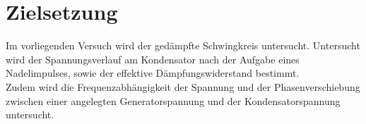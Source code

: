 \section{Zielsetzung}
\label{sec:Zielsetzung}
Im vorliegenden Versuch wird der gedämpfte Schwingkreis untersucht.
Untersucht wird der Spannungsverlauf am Kondensator nach der Aufgabe eines Nadelimpulses, sowie der effektive Dämpfungswiderstand bestimmt. \\
Zudem wird die Frequenzabhängigkeit der Spannung und der Phasenverschiebung zwischen einer angelegten Generatorspannung und der Kondensatorspannung untersucht.
